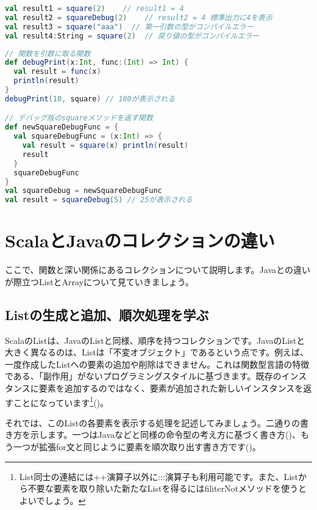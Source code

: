 \begin{lstlisting}[language=scala, label=src:function_call, caption=値としての関数を呼び出す]
val result1 = square(2)    // result1 = 4
val result2 = squareDebug(2)    // result2 = 4 標準出力に4を表示
val result3 = square("aaa")  // 第一引数の型がコンパイルエラー
val result4:String = square(2)  // 戻り値の型がコンパイルエラー
\end{lstlisting}

\begin{lstlisting}[language=scala, label=src:higher_order_function, caption=関数をメソッドの引数や戻り値に利用する]
// 関数を引数に取る関数
def debugPrint(x:Int, func:(Int) => Int) {
  val result = func(x)
  println(result)
}
debugPrint(10, square) // 100が表示される

// デバッグ版のsquareメソッドを返す関数
def newSquareDebugFunc = {
  val squareDebugFunc = (x:Int) => {
    val result = square(x) println(result)
    result
  }
  squareDebugFunc
}
val squareDebug = newSquareDebugFunc
val result = squareDebug(5) // 25が表示される
\end{lstlisting}

\section{ScalaとJavaのコレクションの違い}
ここで、関数と深い関係にあるコレクションについて説明します。Javaとの違いが際立つListとArrayについて見ていきましょう。

\subsection{Listの生成と追加、順次処理を学ぶ}
ScalaのListは、JavaのListと同様、順序を持つコレクションです。JavaのListと大きく異なるのは、Listは「不変オブジェクト」であるという点です。例えば、一度作成したListへの要素の追加や削除はできません。これは関数型言語の特徴である、「副作用」がないプログラミングスタイルに基づきます。既存のインスタンスに要素を追加するのではなく、要素が追加された新しいインスタンスを返すことになっています\footnote{List同士の連結には++演算子以外に:::演算子も利用可能です。また、Listから不要な要素を取り除いた新たなListを得るにはfiliterNotメソッドを使うとよいでしょう。}()。

それでは、このListの各要素を表示する処理を記述してみましょう。二通りの書き方を示します。一つはJavaなどと同様の命令型の考え方に基づく書き方()、もう一つが拡張for文と同じように要素を順次取り出す書き方です()。

